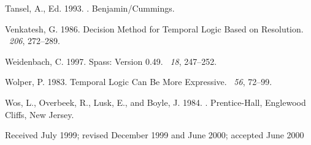 \documentclass[nohyperref]{acmtrans2f}
\begin{document}
\begin{thebibliography}{}
{\sc Tansel, A.}, Ed. 1993.
.
\newblock Benjamin/Cummings.

{\sc Venkatesh, G.} 1986.
 {D}ecision {M}ethod for {T}emporal {L}ogic {B}ased on
  {R}esolution.
~{\em 206}, 272--289.

{\sc Weidenbach, C.} 1997.
\newblock Spass: Version 0.49.
~{\em 18}, 247--252.

{\sc Wolper, P.} 1983.
\newblock Temporal {L}ogic {C}an {B}e {M}ore {E}xpressive.
~{\em 56}, 72--99.

{\sc Wos, L.}, {\sc Overbeek, R.}, {\sc Lusk, E.}, {\sc and} {\sc Boyle, J.}
  1984.
.
\newblock Prentice-Hall, Englewood Cliffs, New Jersey.

\end{thebibliography}
\begin{received}
 Received July 1999;
 revised December 1999 and June 2000;
 accepted June 2000
\end{received}
\end{document}
